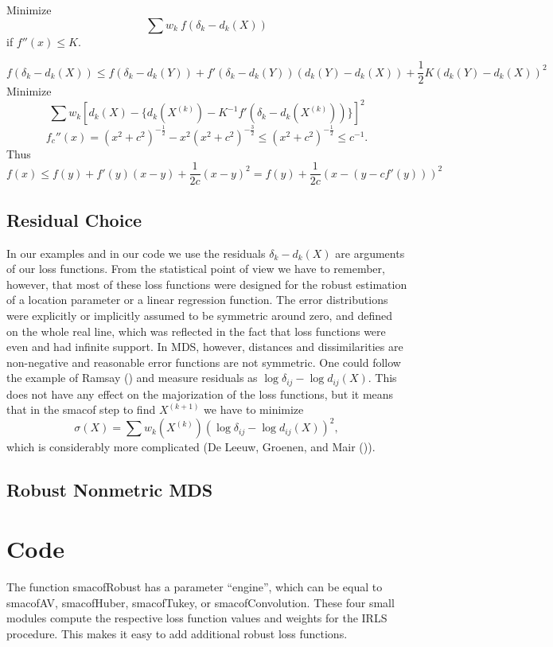 \documentclass[
  12pt,
  letterpaper,
  DIV=11,
  numbers=noendperiod]{scrartcl}
\newcommand{\sectionbreak}{\pagebreak}
\theoremstyle{plain}
\theoremstyle{remark}
\begin{document}
Minimize \[
\sum w_k\ f(\delta_k-d_k(X))
\] if \(f''(x)\leq K\).

\[
f(\delta_k-d_k(X))\leq f(\delta_k-d_k(Y))+f'(\delta_k-d_k(Y))(d_k(Y)-d_k(X))+\frac12K(d_k(Y)-d_k(X))^2
\] Minimize \[
\sum w_k\left[d_k(X)-\{d_k(X^{(k)})-K^{-1}f'(\delta_k-d_k(X^{(k)}))\}\right]^2
\] \[
f_c''(x)=(x^2 + c^2)^{-\frac12}-x^2(x^2 + c^2)^{-\frac32}\leq(x^2 + c^2)^{-\frac12}\leq c^{-1}.
\] Thus \[
f(x)\leq f(y)+f'(y)(x-y)+\frac{1}{2c}(x-y)^2=f(y)+\frac{1}{2c}(x-(y-cf'(y)))^2
\]

\subsection{Residual Choice}\label{residual-choice}

In our examples and in our code we use the residuals \(\delta_k-d_k(X)\)
are arguments of our loss functions. From the statistical point of view
we have to remember, however, that most of these loss functions were
designed for the robust estimation of a location parameter or a linear
regression function. The error distributions were explicitly or
implicitly assumed to be symmetric around zero, and defined on the whole
real line, which was reflected in the fact that loss functions were even
and had infinite support. In MDS, however, distances and dissimilarities
are non-negative and reasonable error functions are not symmetric. One
could follow the example of Ramsay () and
measure residuals as \(\log\delta_{ij}-\log d_{ij}(X)\). This does not
have any effect on the majorization of the loss functions, but it means
that in the smacof step to find \(X^{(k+1)}\) we have to minimize \[
\sigma(X)=\sum w_k(X^{(k)})(\log\delta_{ij}-\log d_{ij}(X))^2,
\] which is considerably more complicated (De Leeuw, Groenen, and Mair
()).

\subsection{Robust Nonmetric MDS}\label{robust-nonmetric-mds}

\sectionbreak

\section{Code}\label{code}

The function smacofRobust has a parameter ``engine'', which can be equal
to smacofAV, smacofHuber, smacofTukey, or smacofConvolution. These four
small modules compute the respective loss function values and weights
for the IRLS procedure. This makes it easy to add additional robust loss
functions.
\end{document}
